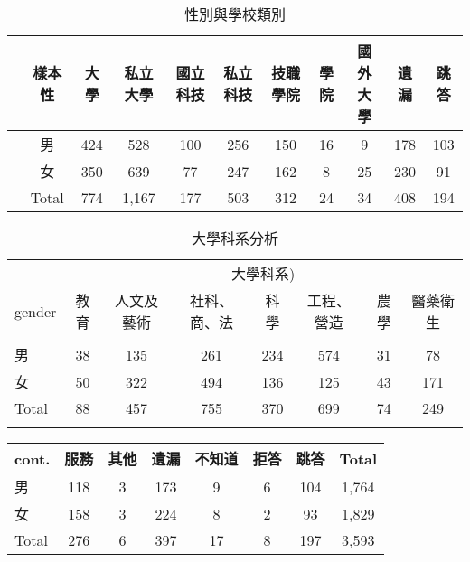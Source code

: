 \documentclass[12pt, a4paper]{article}
\begin{document}
\bigskip

\begin{table}[htbp]
  \centering
  \renewcommand{\arraystretch}{1.3} %
  \caption{性別與學校類別}
  \begin{adjustbox}{width=\textwidth}
    \begin{tabular}{lcccccccccc}
      \toprule
       & 樣本性 & 大學 & 私立大學 & 國立科技 & 私立科技 & 技職學院 & 學院 & 國外大學 & 遺漏 & 跳答 \\
      \midrule
      & 男 & 424 & 528 & 100 & 256 & 150 & 16 & 9 & 178 & 103 \\
      & 女 & 350 & 639 & 77 & 247 & 162 & 8 & 25 & 230 & 91 \\
      \midrule
       & Total& 774 & 1,167 & 177 & 503 & 312 & 24 & 34 & 408 & 194 \\
      \bottomrule
    \end{tabular}
    \label{tab:gender_school}
  \end{adjustbox}
\end{table}

\bigskip

\begin{table}[H]
\centering
\extrarowheight=5pt
\caption{大學科系分析 }
\begin{adjustbox}{width=\textwidth}
\begin{tabular}{l*{7}{c}}
\toprule
 & \multicolumn{7}{c}{大學科系)} \\
gender & 教育 & 人文及藝術 & 社科、商、法 & 科學 & 工程、營造 & 農學 & 醫藥衛生 \\
 \\
\midrule
男 & 38 & 135 & 261 & 234 & 574 & 31 & 78 \\
女 & 50 & 322 & 494 & 136 & 125 & 43 & 171 \\
Total & 88 & 457 & 755 & 370 & 699 & 74 & 249 \\
\bottomrule
\label{tab:gender_major}
\end{tabular}
\end{adjustbox}
\end{table}

\begin{table}[H]
\centering
\extrarowheight=3pt
\begin{adjustbox}{width=0.8\textwidth}
\begin{tabular}{l*{7}{c}}
\toprule
cont. & 服務 & 其他 & 遺漏 & 不知道 & 拒答 & 跳答 & Total \\
\midrule
男 & 118 & 3 & 173 & 9 & 6 & 104 & 1,764 \\
女 & 158 & 3 & 224 & 8 & 2 & 93 & 1,829 \\
Total & 276 & 6 & 397 & 17 & 8 & 197 & 3,593 \\
\bottomrule
\end{tabular}
\end{adjustbox}
\end{table}
\end{document}
